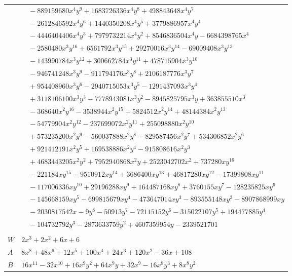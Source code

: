 \documentclass[11pt]{article}
\begin{document}
\begin{longtable}{@{}ll@{}}
 & $\quad -889159680x^{4}y^{9}+1683726336x^{4}y^{8}+498843648x^{4}y^{7}$\\
 & $\quad -2612846592x^{4}y^{6}+1440350208x^{4}y^{5}+3779886957x^{4}y^{4}$\\
 & $\quad -4446404406x^{4}y^{3}+7979732214x^{4}y^{2}+8546836504x^{4}y-6684398765x^{4}$\\
 & $\quad -2580480x^{3}y^{16}+6561792x^{3}y^{15}+29270016x^{3}y^{14}-69009408x^{3}y^{13}$\\
 & $\quad -143990784x^{3}y^{12}+300662784x^{3}y^{11}+478715904x^{3}y^{10}$\\
 & $\quad -946741248x^{3}y^{9}-911794176x^{3}y^{8}+2106187776x^{3}y^{7}$\\
 & $\quad +954408960x^{3}y^{6}-2940715053x^{3}y^{5}-1291437093x^{3}y^{4}$\\
 & $\quad +3118106100x^{3}y^{3}-7778943081x^{3}y^{2}-8945825795x^{3}y+363855510x^{3}$\\
 & $\quad -368640x^{2}y^{16}-3538944x^{2}y^{15}+5824512x^{2}y^{14}+48144384x^{2}y^{13}$\\
 & $\quad -54779904x^{2}y^{12}-237699072x^{2}y^{11}+255098880x^{2}y^{10}$\\
 & $\quad +573235200x^{2}y^{9}-560037888x^{2}y^{8}-829587456x^{2}y^{7}+534306852x^{2}y^{6}$\\
 & $\quad +921412191x^{2}y^{5}+169538886x^{2}y^{4}-915808616x^{2}y^{3}$\\
 & $\quad +4683443205x^{2}y^{2}+7952940868x^{2}y+2523042702x^{2}+737280xy^{16}$\\
 & $\quad -221184xy^{15}-9510912xy^{14}+3686400xy^{13}+46817280xy^{12}-17399808xy^{11}$\\
 & $\quad -117006336xy^{10}+29196288xy^{9}+164487168xy^{8}+3760155xy^{7}-128235825xy^{6}$\\
 & $\quad -145668159xy^{5}-699815679xy^{4}-473647014xy^{3}-893555148xy^{2}-8907868999xy$\\
 & $\quad -2030817542x-9y^{8}-50913y^{7}-72115152y^{6}-315022107y^{5}+194477885y^{4}$\\
 & $\quad -104732792y^{3}-2873633759y^{2}+4607359954y-2339521701$\\
\addlinespace[3pt]
\multicolumn{2}{@{}l}{$i=13$, $m=4$, neighbours $23,43,76,80$}\\
$W$ & $2x^{3}+2x^{2}+6x+6$\\
$A$ & $8x^{8}+48x^{6}+12x^{5}+100x^{4}+24x^{3}+120x^{2}-36x+108$\\
$B$ & $16x^{11}-32x^{10}+16x^{9}y^{2}+64x^{9}y+32x^{9}-16x^{8}y^{3}+8x^{8}y^{2}$\\

\end{longtable}
\end{document}

